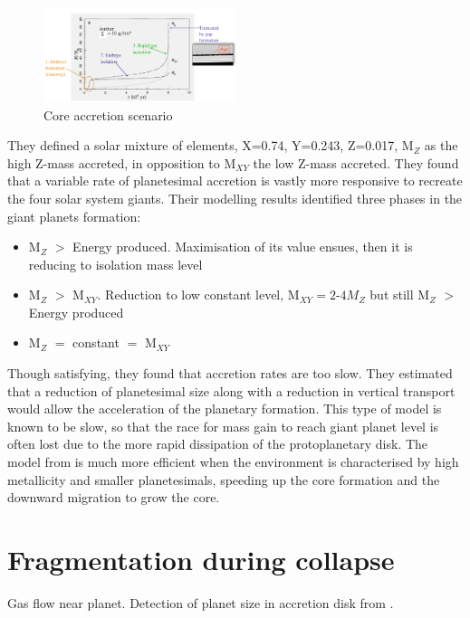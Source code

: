 \documentclass[12pt]{article} %
\begin{document}
\begin{figure}
\begin{center}
 \includegraphics[width=0.5\textwidth,keepaspectratio=true]{./images/pollack1996}
 \caption{Core accretion scenario \cite{pollack1996formation}}
 \label{pollack1996}
\end{center}
\end{figure}

\noindent They defined a solar mixture of elements, X=0.74, Y=0.243, Z=0.017, M$_Z$ as the high Z-mass accreted, in opposition to M$_{XY}$ the low Z-mass accreted. They found that a variable rate of planetesimal accretion \cite{lissauer1987timescales} is vastly more responsive to recreate the four solar system giants. Their modelling results identified three phases in the giant planets formation:

\begin{itemize}
\setlength\itemsep{0em}
\item M$_Z$ $>$ Energy produced. Maximisation of its value ensues, then it is reducing to isolation mass level
\item M$_Z$ $>$ M$_{XY}$. Reduction to low constant level, M$_{XY} = 2$-$4 M_Z$ but still M$_Z$ $>$ Energy produced
\item M$_Z$ $=$ constant $=$ M$_{XY}$
\end{itemize}

\noindent Though satisfying, they found that accretion rates are too slow. They estimated that a reduction of planetesimal size along with a reduction in vertical transport would allow the acceleration of the planetary formation. This type of model is known to be slow, so that the race for mass gain to reach giant planet level is often lost due to the more rapid dissipation of the protoplanetary disk. The model from \cite{pollack1996formation} is much more efficient when the environment is characterised by high metallicity and smaller planetesimals, speeding up the core formation and the downward migration to grow the core.

\section{Fragmentation during collapse}\vspace{-2ex}\titlerule[1pt]\bigskip
Gas flow near planet. 
Detection of planet size in accretion disk from \cite{bate2003three}.\newline
\end{document}
